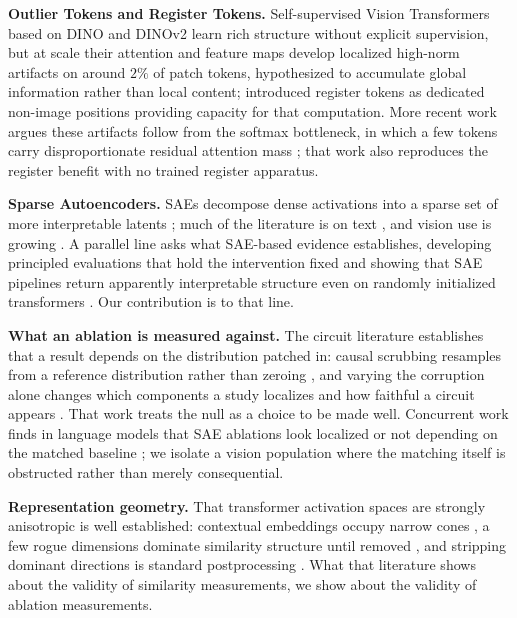 \documentclass{article}
\begin{document}
\textbf{Outlier Tokens and Register Tokens.} Self-supervised Vision Transformers based on DINO \citep{caron2021emerging} and DINOv2 \citep{oquab2023dinov2} learn rich structure without explicit supervision, but at scale their attention and feature maps develop localized high-norm artifacts on around $2\%$ of patch tokens, hypothesized to accumulate global information rather than local content; \citet{darcet2023vision} introduced register tokens as dedicated non-image positions providing capacity for that computation. More recent work argues these artifacts follow from the softmax bottleneck, in which a few tokens carry disproportionate residual attention mass \citep{jiang2025vision}; that work also reproduces the register benefit with no trained register apparatus.

\textbf{Sparse Autoencoders.} SAEs decompose dense activations into a sparse set of more interpretable latents \citep{cunningham2023sparse}; much of the literature is on text \citep{gao2024scaling, templeton2024scaling}, and vision use is growing \citep{fel2025archetypal}. A parallel line asks what SAE-based evidence establishes, developing principled evaluations that hold the intervention fixed \citep{makelov2024principled} and showing that SAE pipelines return apparently interpretable structure even on randomly initialized transformers \citep{heap2025sparse}. Our contribution is to that line.

\textbf{What an ablation is measured against.} The circuit literature establishes that a result depends on the distribution patched in: causal scrubbing resamples from a reference distribution rather than zeroing \citep{chan2022causal}, and varying the corruption alone changes which components a study localizes and how faithful a circuit appears \citep{zhang2024towards, miller2024transformer, heimersheim2024how}. That work treats the null as a choice to be made well. Concurrent work finds in language models that SAE ablations look localized or not depending on the matched baseline \citep{luo2026when}; we isolate a vision population where the matching itself is obstructed rather than merely consequential.

\textbf{Representation geometry.} That transformer activation spaces are strongly anisotropic is well established: contextual embeddings occupy narrow cones \citep{ethayarajh2019contextual, gao2019representation}, a few rogue dimensions dominate similarity structure until removed \citep{timkey2021bark}, and stripping dominant directions is standard postprocessing \citep{mu2018allbut}. What that literature shows about the validity of similarity measurements, we show about the validity of ablation measurements.
\end{document}
